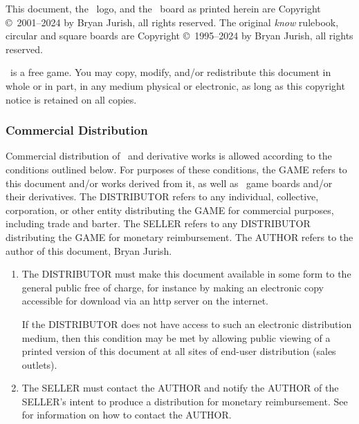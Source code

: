%

This document, the \latex{\knowlatex}\html{\knowhtml}\ logo,
and the \know\ board as printed
herein are Copyright \copyright\ 2001--2024 by Bryan Jurish,  all rights reserved.
The original {\sl know} rulebook, circular and square boards are
Copyright \copyright\ 1995--2024 by Bryan Jurish, all rights reserved.

\know\ is a free game.  You may copy, modify, and/or redistribute
this document in whole or in part, in any medium physical or electronic,
as long as this copyright notice is retained on all copies.

\subsubsection{Commercial Distribution}\label{commercial}

Commercial distribution of \know\ and derivative works is allowed
according to the conditions outlined below.
For purposes of these conditions, the GAME refers to this document
and/or works derived from it, as well as \know\ game boards and/or their
derivatives.  The DISTRIBUTOR refers to any individual, collective, corporation,
or other entity distributing the GAME for commercial purposes,
including trade and barter.  The SELLER refers to any DISTRIBUTOR
distributing the GAME for monetary reimbursement.
The AUTHOR refers to the author of this document, Bryan Jurish.

\begin{enumerate}
  \item
    The DISTRIBUTOR must make this document available in some
    form to the general public free of charge,
    for instance by making an electronic copy accessible for
    download via an http server on the internet.

    If the DISTRIBUTOR does not have access to such an
    electronic distribution medium, then this condition may be
    met by allowing public viewing of a printed version of this
    document at all sites of end-user distribution (sales outlets).

  \item
    The SELLER must contact the AUTHOR and notify the
    AUTHOR of the SELLER's intent to produce a distribution
    for monetary reimbursement.  See  for information
    on how to contact the AUTHOR.
\end{enumerate}

%
